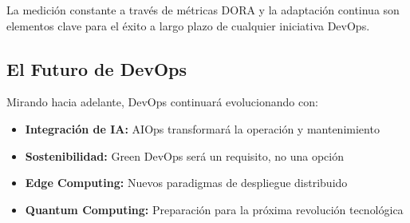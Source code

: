 \documentclass[12pt,a4paper]{article}
\begin{document}
La medición constante a través de métricas DORA y la adaptación continua son elementos clave para el éxito a largo plazo de cualquier iniciativa DevOps.

\subsection{El Futuro de DevOps}
Mirando hacia adelante, DevOps continuará evolucionando con:
\begin{itemize}
    \item \textbf{Integración de IA:} AIOps transformará la operación y mantenimiento
    \item \textbf{Sostenibilidad:} Green DevOps será un requisito, no una opción
    \item \textbf{Edge Computing:} Nuevos paradigmas de despliegue distribuido
    \item \textbf{Quantum Computing:} Preparación para la próxima revolución tecnológica
\end{itemize}
\end{document}
